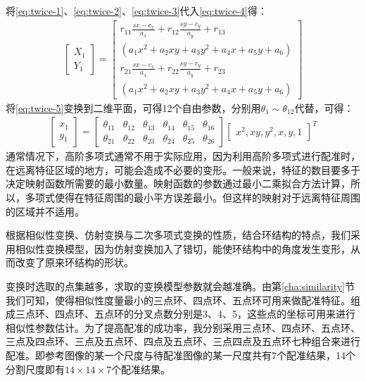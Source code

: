 \begin{enumerate}
将\ref{eq:twice-1}、\ref{eq:twice-2}、\ref{eq:twice-3}代入\ref{eq:twice-4}得：
\begin{align}
\left[ \begin{array}{c}
X_1 \\
Y_1
\end{array} \right]
=
\left[ \begin{array}{c}
r_{11}\frac{sx-c_x}{a_x} + r_{12}\frac{sy-c_y}{a_y} + r_{13} \\
(a_1x^2 + a_2xy + a_3y^2 + a_4x + a_5y + a_6)\\
r_{21}\frac{sx-c_x}{a_x} + r_{22}\frac{sy-c_y}{a_y} + r_{23}\\
(a_1x^2 + a_2xy + a_3y^2 + a_4x + a_5y + a_6)
\end{array} \right]
\label{eq:twice-5}
\end{align}
将\ref{eq:twice-5}变换到二维平面，可得12个自由参数，分别用$\theta_1 \sim \theta_{12}$代替，可得：
\begin{align}
\left[ \begin{array}{c}
x_1 \\
y_1
\end{array} \right]
=
\left[ \begin{array}{cccccc}
\theta_{11} & \theta_{12} & \theta_{13} & \theta_{14} & \theta_{15} & \theta_{16} \\
\theta_{21} & \theta_{22} & \theta_{23} & \theta_{24} & \theta_{25} & \theta_{26} 
\end{array} \right]
\left[ \begin{array}{c}
x^2, xy, y^2, x, y, 1
\end{array} \right]^T
\end{align}
通常情况下，高阶多项式通常不用于实际应用，因为利用高阶多项式进行配准时，在远离特征区域的地方，可能会造成不必要的变形。一般来说，特征的数目要多于决定映射函数所需要的最小数量。映射函数的参数通过最小二乘拟合方法计算，所以，多项式使得在特征周围的最小平方误差最小。但这样的映射对于远离特征周围的区域并不适用。
\end{enumerate}

根据相似性变换、仿射变换与二次多项式变换的性质，结合环结构的特点，我们采用相似性变换模型，因为仿射变换加入了错切，能使环结构中的角度发生变形，从而改变了原来环结构的形状。

变换时选取的点集越多，求取的变换模型参数就会越准确。由第\ref{cha:similarity}节我们可知，使得相似性度量最小的三点环、四点环、五点环可用来做配准特征。组成三点环、四点环、五点环的分叉点数分别是3、4、5，这些点的坐标可用来进行相似性参数估计。为了提高配准的成功率，我分别采用三点环、四点环、五点环、三点及四点环、三点及五点环、四点及五点环、三点四点及五点环七种组合来进行配准。即参考图像的某一个尺度与待配准图像的某一尺度共有7个配准结果，14个分割尺度即有$14 \times 14 \times 7$个配准结果。

